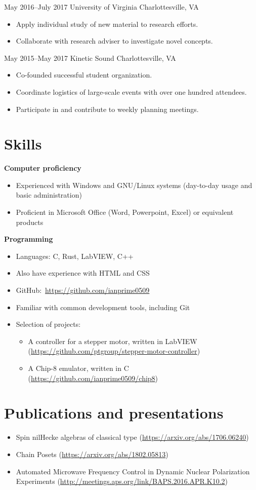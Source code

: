 \documentclass[10pt]{article}
\begin{document}
{May 2016--July 2017}
{University of Virginia}
{Charlottesville, VA}
\begin{itemize}
\item Apply individual study of new material to research efforts.
\item Collaborate with research adviser to investigate novel concepts.
\end{itemize}

{May 2015--May 2017}
{Kinetic Sound}
{Charlottesville, VA}
\begin{itemize}
\item Co-founded successful student organization.
\item Coordinate logistics of large-scale events with over one hundred attendees.
\item Participate in and contribute to weekly planning meetings.
\end{itemize}

\section*{Skills}
\textbf{Computer proficiency}
\begin{itemize}
\item Experienced with Windows and GNU/Linux systems (day-to-day usage and
  basic administration)
\item Proficient in Microsoft Office (Word, Powerpoint, Excel) or equivalent
  products
\end{itemize}
\textbf{Programming}
\begin{itemize}
\item Languages: C, Rust, LabVIEW, C++
\item Also have experience with HTML and CSS
\item GitHub:~\url{https://github.com/ianprime0509}
\item Familiar with common development tools, including Git
\item Selection of projects:
  \begin{itemize}
  \item A controller for a stepper motor, written in LabVIEW
    (\url{https://github.com/ptgroup/stepper-motor-controller})
  \item A Chip-8 emulator, written in C
    (\url{https://github.com/ianprime0509/chip8})
  \end{itemize}
\end{itemize}

\section*{Publications and presentations}
\begin{itemize}
\item Spin nilHecke algebras of classical type
  (\url{https://arxiv.org/abs/1706.06240})
\item Chain Posets (\url{https://arxiv.org/abs/1802.05813})
\item Automated Microwave Frequency Control in Dynamic Nuclear Polarization
  Experiments (\url{http://meetings.aps.org/link/BAPS.2016.APR.K10.2})
\end{itemize}
\end{document}
